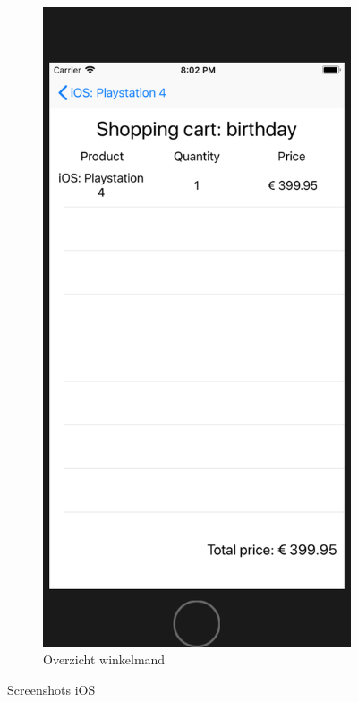\begin{figure}[H]
\begin{subfigure}{.5\textwidth}
		\includegraphics[width=0.65\linewidth]{img/poc/ios/4.png}
		\caption{Overzicht winkelmand}
		\label{fig:sub2}
	\end{subfigure}
	\caption{Screenshots iOS}
	\label{fig:test}
\end{figure}